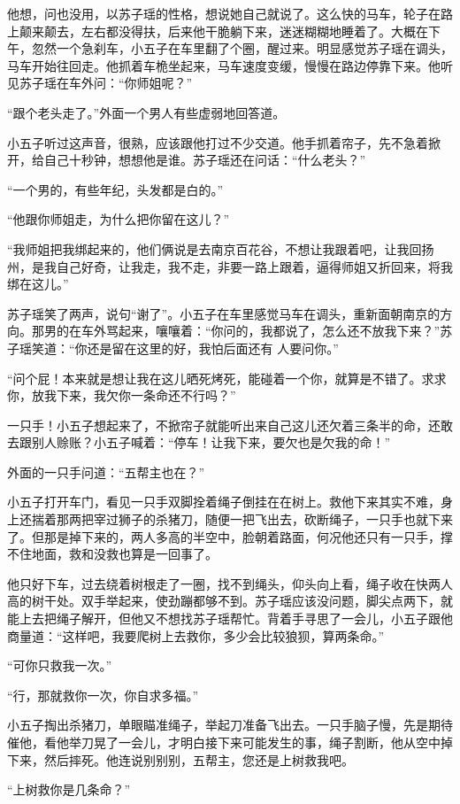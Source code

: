 他想，问也没用，以苏子瑶的性格，想说她自己就说了。这么快的马车，轮子在路上颠来颠去，左右都没得扶，后来他干脆躺下来，迷迷糊糊地睡着了。大概在下午，忽然一个急刹车，小五子在车里翻了个圈，醒过来。明显感觉苏子瑶在调头，马车开始往回走。他抓着车桅坐起来，马车速度变缓，慢慢在路边停靠下来。他听见苏子瑶在车外问：“你师姐呢？”

“跟个老头走了。”外面一个男人有些虚弱地回答道。

小五子听过这声音，很熟，应该跟他打过不少交道。他手抓着帘子，先不急着掀开，给自己十秒钟，想想他是谁。苏子瑶还在问话：“什么老头？”

“一个男的，有些年纪，头发都是白的。”

“他跟你师姐走，为什么把你留在这儿？”

“我师姐把我绑起来的，他们俩说是去南京百花谷，不想让我跟着吧，让我回扬州，是我自己好奇，让我走，我不走，非要一路上跟着，逼得师姐又折回来，将我绑在这儿。”

苏子瑶笑了两声，说句“谢了”。小五子在车里感觉马车在调头，重新面朝南京的方向。那男的在车外骂起来，嚷嚷着：“你问的，我都说了，怎么还不放我下来？”苏子瑶笑道：“你还是留在这里的好，我怕后面还有
人要问你。”

“问个屁！本来就是想让我在这儿晒死烤死，能碰着一个你，就算是不错了。求求你，放我下来，我欠你一条命还不行吗？”

一只手！小五子想起来了，不掀帘子就能听出来自己这儿还欠着三条半的命，还敢去跟别人赊账？小五子喊着：“停车！让我下来，要欠也是欠我的命！”

外面的一只手问道：“五帮主也在？”

小五子打开车门，看见一只手双脚拴着绳子倒挂在在树上。救他下来其实不难，身上还揣着那两把宰过狮子的杀猪刀，随便一把飞出去，砍断绳子，一只手也就下来了。但那是掉下来的，两人多高的半空中，脸朝着路面，何况他还只有一只手，撑不住地面，救和没救也算是一回事了。

他只好下车，过去绕着树根走了一圈，找不到绳头，仰头向上看，绳子收在快两人高的树干处。双手举起来，使劲蹦都够不到。苏子瑶应该没问题，脚尖点两下，就能上去把绳子解开，但他又不想找苏子瑶帮忙。背着手寻思了一会儿，小五子跟他商量道：“这样吧，我要爬树上去救你，多少会比较狼狈，算两条命。”

“可你只救我一次。”

“行，那就救你一次，你自求多福。”

小五子掏出杀猪刀，单眼瞄准绳子，举起刀准备飞出去。一只手脑子慢，先是期待催他，看他举刀晃了一会儿，才明白接下来可能发生的事，绳子割断，他从空中掉下来，然后摔死。他连说别别别，五帮主，您还是上树救我吧。

“上树救你是几条命？”

